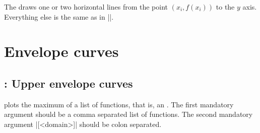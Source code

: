 \begin{tzcode}{.3}
\end{tzcode}

\begin{tzcode}{.3}
\end{tzcode}

The   draws one or two horizontal lines from the point $(x_i,f(x_i))$ to the $y$ axis.
Everything else is the same as in |\tzfnarealine|.

\begin{tzcode}{.3}
\end{tzcode}


\section{Envelope curves}
\label{s:evelopecurves}


\subsection{\protect\cmd{\tzfnmax}: Upper envelope curves}
\label{ss:tzfnmax}

\icmd{\tzfnmax} plots the maximum of a list of functions, that is, an  . The first mandatory argument should be a comma separated list of functions.
The second mandatory argument |[<domain>]| should be colon separated.

